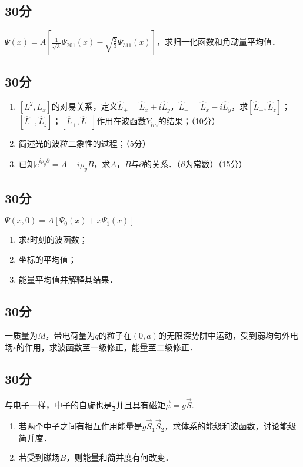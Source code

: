 
\subsection{30分}
$\varPsi (x)=A[\frac{1}{\sqrt{3}}\varPsi_{201}(x)-\sqrt{\frac{2}{3}}\varPsi_{311}(x)]$，求归一化函数和角动量平均值．
\subsection{30分}
\begin{enumerate}
\item $[L^{2},L_{x}]$的对易关系，定义$\hat{L}_{+}=\hat{L}_{x}+i\hat{L}_{y}$，$\hat{L}_{-}=\hat{L}_{x}-i\hat{L}_{y}$，求$[\hat{L}_{+},\hat{L}_{z}]$；$[\hat{L}_{-},\hat{L}_{z}]$；$[\hat{L}_{+},\hat{L}_{-}]$作用在波函数$Y_{lm}$的结果；（10分）
\item 简述光的波粒二象性的过程；（5分）
\item 已知$e^{i\rho_{y}\partial}=A+i\rho_{y}B$，求$A$，$B$与$\partial$的关系．（$\partial$为常数）（15分）
\end{enumerate}
\subsection{30分}
$\varPsi (x,0)=A[\varPsi_{0}(x)+x\varPsi_{1}(x)]$
\begin{enumerate}
\item 求$t$时刻的波函数；
\item 坐标的平均值；
\item 能量平均值并解释其结果．
\end{enumerate}
\subsection{30分}
一质量为$M$，带电荷量为$q$的粒子在$(0,a)$的无限深势阱中运动，受到弱均匀外电场$\epsilon$的作用，求波函数至一级修正，能量至二级修正．
\subsection{30分}
与电子一样，中子的自旋也是$\frac{1}{2}$并且具有磁矩$\vec{\mu}=g\vec{S}$.
\begin{enumerate}
\item 若两个中子之间有相互作用能量是$g\vec{S}_{1}\vec{S}_{2}$，求体系的能级和波函数，讨论能级简并度．
\item 若受到磁场$B$，则能量和简并度有何改变．
\end{enumerate}